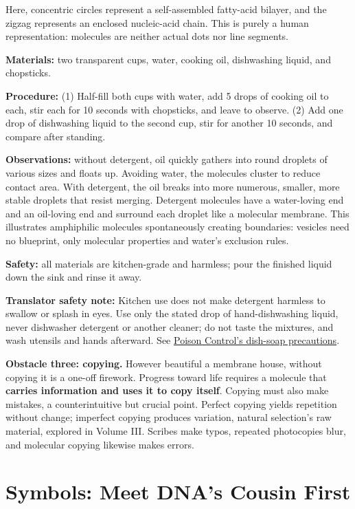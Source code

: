 Here, concentric circles represent a self-assembled fatty-acid bilayer, and the zigzag represents an enclosed nucleic-acid chain. This is purely a human representation: molecules are neither actual dots nor line segments.

\begin{shiyan}
\textbf{Materials:} two transparent cups, water, cooking oil, dishwashing liquid, and chopsticks.

\textbf{Procedure:} (1) Half-fill both cups with water, add 5 drops of cooking oil to each, stir each for 10 seconds with chopsticks, and leave to observe. (2) Add one drop of dishwashing liquid to the second cup, stir for another 10 seconds, and compare after standing.

\textbf{Observations:} without detergent, oil quickly gathers into round droplets of various sizes and floats up. Avoiding water, the molecules cluster to reduce contact area. With detergent, the oil breaks into more numerous, smaller, more stable droplets that resist merging. Detergent molecules have a water-loving end and an oil-loving end and surround each droplet like a molecular membrane. This illustrates amphiphilic molecules spontaneously creating boundaries: vesicles need no blueprint, only molecular properties and water's exclusion rules.

\textbf{Safety:} all materials are kitchen-grade and harmless; pour the finished liquid down the sink and rinse it away.

\textbf{Translator safety note:} Kitchen use does not make detergent harmless to swallow or splash in eyes. Use only the stated drop of hand-dishwashing liquid, never dishwasher detergent or another cleaner; do not taste the mixtures, and wash utensils and hands afterward. See \href{https://www.poison.org/articles/hand-dish-soap}{Poison Control's dish-soap precautions}.
\end{shiyan}

\textbf{Obstacle three: copying.} However beautiful a membrane house, without copying it is a one-off firework. Progress toward life requires a molecule that \textbf{carries information and uses it to copy itself}. Copying must also make mistakes, a counterintuitive but crucial point. Perfect copying yields repetition without change; imperfect copying produces variation, natural selection's raw material, explored in Volume III. Scribes make typos, repeated photocopies blur, and molecular copying likewise makes errors.

\section{Symbols: Meet DNA's Cousin First}

